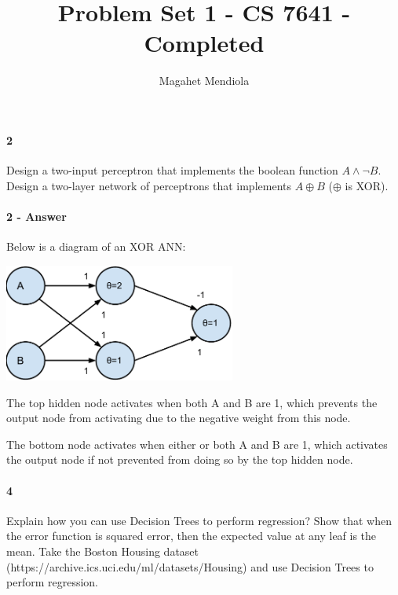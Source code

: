 \documentclass[10pt,letter]{article}
\begin{document}
\title{Problem Set 1 - CS 7641 - Completed}
\author{Magahet Mendiola}
\maketitle


\paragraph{2} Design a two-input perceptron that implements the boolean function $A \land \lnot B$. Design a two-layer network of perceptrons that implements $A \oplus B$ ($\oplus$ is XOR).

\paragraph{2 - Answer}

Below is a diagram of an XOR ANN:

\includegraphics[width=3in]{xor_ann.pdf}

The top hidden node activates when both A and B are 1, which prevents the output node from activating due to the negative weight from this node.

The bottom node activates when either or both A and B are 1, which activates the output node if not prevented from doing so by the top hidden node.


\paragraph{4} Explain how you can use Decision Trees to perform regression? Show that when the error function is squared error, then the expected value at any leaf is the mean. Take the Boston Housing dataset (https://archive.ics.uci.edu/ml/datasets/Housing) and use Decision Trees to perform regression. 
\end{document}
